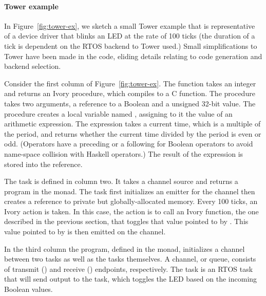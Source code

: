 \paragraph{Tower example}
In Figure~\ref{fig:tower-ex}, we sketch a small Tower example that is
representative of a device driver that blinks an LED at the rate of 100 ticks
(the duration of a tick is dependent on the RTOS backend to Tower used.)  Small
simplifications to Tower have been made in the code, eliding details relating to
code generation and backend selection.

Consider the first column of Figure~\ref{fig:tower-ex}.  The function takes an
integer and returns an Ivory procedure, which compiles to a C function.  The
procedure takes two arguments, a reference to a Boolean and a unsigned 32-bit
value.  The procedure creates a local variable named ,
assigning to it the value of an arithmetic expression.  The expression
takes a current time, which is a multiple of the period, and returns whether the
current time divided by the period is even or odd.  (Operators have a preceding
 or a following  for Boolean operators to avoid name-space collision
with Haskell operators.)  The result of the expression is stored into the
 reference.

The  task is defined in column two.  It takes a channel source and
returns a program in the  monad.  The task first
initializes an emitter for the channel then creates a reference to private but
globally-allocated memory.  Every 100 ticks, an Ivory action is taken.  In this
case, the action is to call an Ivory function, the one described in the
previous section, that toggles that value pointed to by .  This value
pointed to by  is then emitted on the channel.

In the third column the program, defined in the  monad, initializes a
channel between two tasks as well as the tasks themselves.  A channel, or queue,
consists of transmit () and receive () endpoints, respectively.
The  task is an RTOS task that will send output to the
 task, which toggles the LED based on the incoming Boolean
values.


